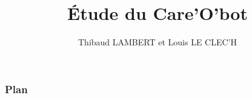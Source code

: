 \documentclass[handout]{beamer}
\title[Care'O'bot ~~~~~~~~ \insertframenumber/\inserttotalframenumber]{\'Etude du Care'O'bot}
\author{Thibaud LAMBERT et Louis LE CLEC'H}
\institute{ENSEIRB-MATMECA}
\begin{document}
	\begin{frame}
		\titlepage
	\end{frame}

	\begin{frame}
		\frametitle{Plan}
		\tableofcontents[hideallsubsections]
	\end{frame}

	
	
	
        
	
\end{document}
